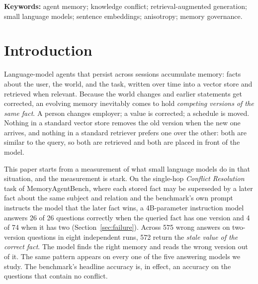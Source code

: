 \documentclass[journal=jcisd8,manuscript=article]{achemso}
\begin{document}
\newcommand{\code}[1]{\texttt{\detokenize{#1}}}
\newcommand{\placeholderfigure}[2]{%
  \begin{figure}[H]\centering
  \fbox{\parbox[c][4.2cm][c]{0.90\linewidth}{\centering\textbf{#1}\\[0.6em]#2}}
  \caption{#1}\end{figure}}


\noindent\textbf{Keywords:} agent memory; knowledge conflict; retrieval-augmented generation; small language models; sentence embeddings; anisotropy; memory governance.

\section{Introduction}

Language-model agents that persist across sessions accumulate memory: facts about the user, the world, and the task, written over time into a vector store and retrieved when relevant. Because the world changes and earlier statements get corrected, an evolving memory inevitably comes to hold \emph{competing versions of the same fact}. A person changes employer; a value is corrected; a schedule is moved. Nothing in a standard vector store removes the old version when the new one arrives, and nothing in a standard retriever prefers one over the other: both are similar to the query, so both are retrieved and both are placed in front of the model.

This paper starts from a measurement of what small language models do in that situation, and the measurement is stark. On the single-hop \emph{Conflict Resolution} task of MemoryAgentBench, where each stored fact may be superseded by a later fact about the same subject and relation and the benchmark's own prompt instructs the model that the later fact wins, a 4B-parameter instruction model answers 26 of 26 questions correctly when the queried fact has one version and 4 of 74 when it has two (Section~\ref{sec:failure}). Across 575 wrong answers on two-version questions in eight independent runs, 572 return the \emph{stale value of the correct fact}. The model finds the right memory and reads the wrong version out of it. The same pattern appears on every one of the five answering models we study. The benchmark's headline accuracy is, in effect, an accuracy on the questions that contain no conflict.
\end{document}
